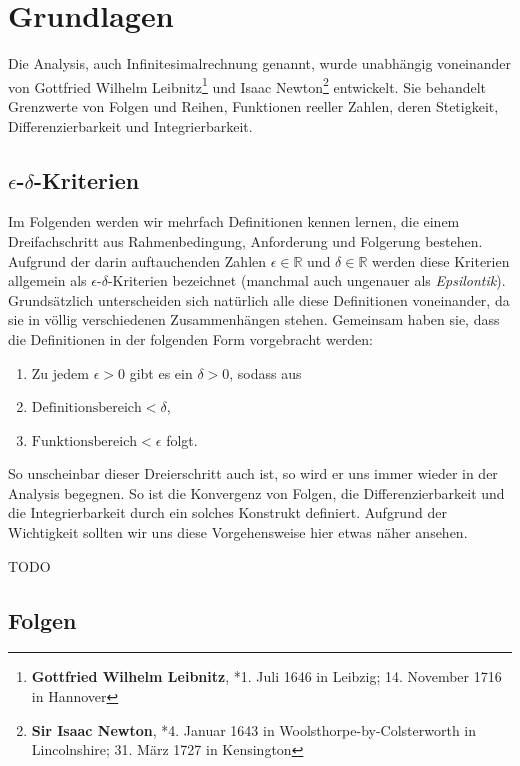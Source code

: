 
\chapter{Grundlagen}

Die Analysis, auch Infinitesimalrechnung genannt, wurde unabhängig voneinander von Gottfried Wilhelm Leibnitz\footnote{\textbf{Gottfried Wilhelm Leibnitz}, *1. Juli 1646 in Leibzig; 14. November 1716 in Hannover} und Isaac Newton\footnote{\textbf{Sir Isaac Newton}, *4. Januar 1643 in Woolsthorpe-by-Colsterworth in Lincolnshire; 31. März 1727 in Kensington} entwickelt. Sie behandelt Grenzwerte von Folgen und Reihen, Funktionen reeller Zahlen, deren Stetigkeit, Differenzierbarkeit und Integrierbarkeit. 

\section{$\epsilon$-$\delta$-Kriterien}

Im Folgenden werden wir mehrfach Definitionen kennen lernen, die einem Dreifachschritt aus Rahmenbedingung, Anforderung und Folgerung bestehen. Aufgrund der darin auftauchenden Zahlen $\epsilon\in \mathbb{R}$ und $\delta\in\mathbb{R}$ werden diese Kriterien allgemein als $\epsilon$-$\delta$-Kriterien bezeichnet (manchmal auch ungenauer als \emph{Epsilontik}). Grundsätzlich unterscheiden sich natürlich alle diese Definitionen voneinander, da sie in völlig verschiedenen Zusammenhängen stehen. Gemeinsam haben sie, dass die Definitionen in der folgenden Form vorgebracht werden:

\begin{enumerate}
\item Zu jedem $\epsilon>0$ gibt es ein $\delta>0$, sodass aus
\item $\text{Definitionsbereich} < \delta$,
\item $\text{Funktionsbereich} < \epsilon$ folgt.
\end{enumerate}

So unscheinbar dieser Dreierschritt auch ist, so wird er uns immer wieder in der Analysis begegnen. So ist die Konvergenz von Folgen, die Differenzierbarkeit und die Integrierbarkeit durch ein solches Konstrukt definiert. Aufgrund der Wichtigkeit sollten wir uns diese Vorgehensweise hier etwas näher ansehen.

TODO


\section{Folgen}

